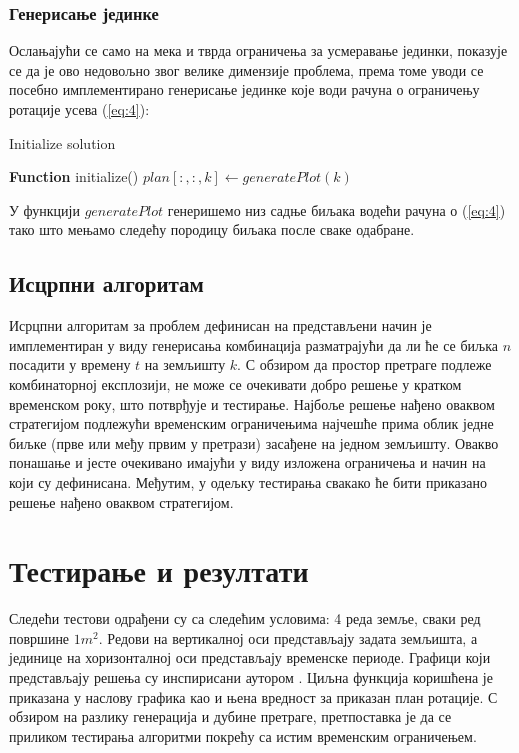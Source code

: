 \documentclass[12pt,fleqn]{article}
\begin{document}
\subsubsection{Генерисање јединке}
Ослањајући се само на мека и тврда ограничења за усмеравање јединки, показује се да је ово недовољно звог велике димензије проблема, према томе уводи се посебно имплементирано генерисање јединке које води рачуна о ограничењу ротације усева (\ref{eq:4}):


\begin{algorithm}
\caption{Initialize solution}
\begin{algorithmic}[1]
\State \textbf{Function} initialize()
    \State $plan[:,:,k] \gets generatePlot(k)$
\EndFor
\end{algorithmic}
\end{algorithm}

У функцији $generatePlot$ генеришемо низ садње биљака водећи рачуна о (\ref{eq:4}) тако што мењамо следећу породицу биљака после сваке одабране.

\subsection{Исцрпни алгоритам}
Исрцпни алгоритам за проблем дефинисан на представљени начин је имплементиран у виду генерисања комбинација разматрајући да ли ће се биљка $n$ посадити у времену $t$ на земљишту $k$. С обзиром да простор претраге подлеже комбинаторној експлозији, не може се очекивати добро решење у кратком временском року, што потврђује и тестирање. Најбоље решење нађено оваквом стратегијом подлежући временским ограничењима најчешће прима облик једне биљке (прве или међу првим у претрази) засађене на једном земљишту. Овакво понашање и јесте очекивано имајући у виду изложена ограничења и начин на који су дефинисана. Међутим, у одељку тестирања свакако ће бити приказано решење нађено оваквом стратегијом.

\section{Тестирање и резултати}
Следећи тестови одрађени су са следећим условима: 4 реда земље, сваки ред површине $1m^2$. Редови на вертикалној оси представљају задата земљишта, а јединице на хоризонталној оси представљају временске периоде. Графици који представљају решења су инспирисани аутором \cite{dwave}. Циљна функција коришћена је приказана у наслову графика као и њена вредност за приказан план ротације. С обзиром на разлику генерација и дубине претраге, претпоставка је да се приликом тестирања алгоритми покрећу са истим временским ограничењем.
\end{document}
